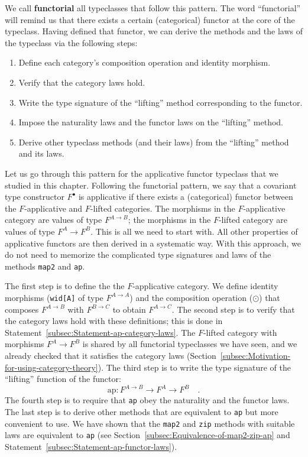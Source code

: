 We call \textbf{functorial} all
typeclasses that follow this pattern. The word \textsf{``}functorial\textsf{''} will
remind us that there exists a certain (categorical) functor at the
core of the typeclass. Having defined that functor, we can derive
the methods and the laws of the typeclass via the following steps:
\begin{enumerate}
\item Define each category\textsf{'}s composition operation and identity morphism.
\item Verify that the category laws hold.
\item Write the type signature of the \textsf{``}lifting\textsf{''} method corresponding
to the functor.
\item Impose the naturality laws and the functor laws on the \textsf{``}lifting\textsf{''}
method.
\item Derive other typeclass methods (and their laws) from the \textsf{``}lifting\textsf{''}
method and its laws.
\end{enumerate}
Let us go through this pattern for the applicative functor typeclass
that we studied in this chapter. Following the functorial pattern,
we say that a covariant type constructor $F^{\bullet}$ is applicative
if there exists a (categorical) functor between the $F$-applicative
and $F$-lifted categories. The morphisms in the $F$-applicative
category are values of type $F^{A\rightarrow B}$; the morphisms in
the $F$-lifted category are values of type $F^{A}\rightarrow F^{B}$.
This is all we need to start with. All other properties of applicative
functors are then derived in a systematic way. With this approach,
we do not need to memorize the complicated type signatures and laws
of the methods \lstinline!map2! and \lstinline!ap!.

The first step is to define the the $F$-applicative category. We
define identity morphisms (\lstinline!wid[A]! of type $F^{A\rightarrow A}$)
and the composition operation ($\odot$) that composes $F^{A\rightarrow B}$
with $F^{B\rightarrow C}$ to obtain $F^{A\rightarrow C}$. The second
step is to verify that the category laws hold with these definitions;
this is done in Statement~\ref{subsec:Statement-ap-category-laws}.
The $F$-lifted category with morphisms $F^{A}\rightarrow F^{B}$
is shared by all functorial typeclasses we have seen, and we already
checked that it satisfies the category laws (Section~\ref{subsec:Motivation-for-using-category-theory}).
The third step is to write the type signature of the \textsf{``}lifting\textsf{''}
function of the functor:
\[
\text{ap}:F^{A\rightarrow B}\rightarrow F^{A}\rightarrow F^{B}\quad.
\]
The fourth step is to require that \lstinline!ap! obey the naturality
and the functor laws. The last step is to derive other methods that
are equivalent to \lstinline!ap! but more convenient to use. We have
shown that the \lstinline!map2! and \lstinline!zip! methods with
suitable laws are equivalent to \lstinline!ap! (see Section~\ref{subsec:Equivalence-of-map2-zip-ap}
and Statement~\ref{subsec:Statement-ap-functor-laws}). 

